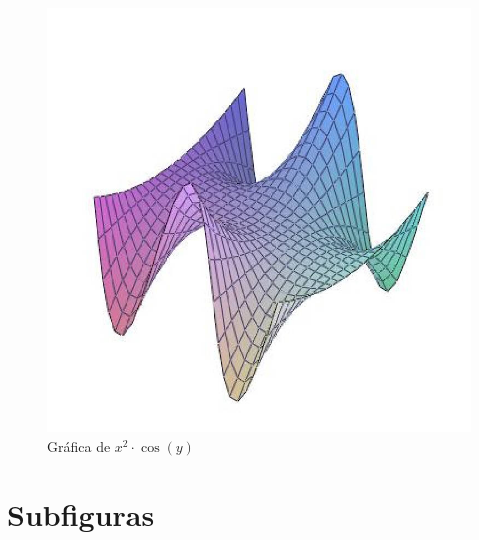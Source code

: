 \documentclass[letterpaper,12pt]{article}
\begin{document}
\begin{figure}[h!]
\centering
\includegraphics[angle=45,scale=0.5]{grafica10.jpg}
\caption{Gráfica de $x^2 \cdot \cos (y)$}
\end{figure}

\newpage

\section{Subfiguras}
\end{document}
